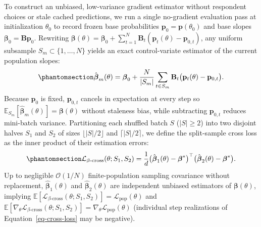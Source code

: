 \documentclass[
  11pt,
  letterpaper,
]{article}
\begin{document}
To construct an unbiased, low-variance gradient estimator without
respondent choices or stale cached predictions, we run a single
no-gradient evaluation pass at initialization \(\theta_0\) to record
frozen base probabilities \(\mathbf{p}_0 = \mathbf{p}(\theta_0)\) and
base slopes \(\boldsymbol{\beta}_0 = \mathbf{B}\mathbf{p}_0\). Rewriting
\(\boldsymbol{\beta}(\theta) = \boldsymbol{\beta}_0 + \sum_{t=1}^N \mathbf{B}_t (\mathbf{p}_t(\theta) - \mathbf{p}_{0,t})\),
any uniform subsample \(S_m \subset \{1, \dots, N\}\) yields an exact
control-variate estimator of the current population slopes:
\begin{equation}\protect\phantomsection\label{eq-cv-beta}{
\hat{\boldsymbol{\beta}}_m(\theta) = \boldsymbol{\beta}_0 + \frac{N}{|S_m|} \sum_{t \in S_m} \mathbf{B}_t \big(\mathbf{p}_t(\theta) - \mathbf{p}_{0,t}\big).
}\end{equation} Because \(\mathbf{p}_0\) is fixed, \(\mathbf{p}_{0,t}\)
cancels in expectation at every step so
\(\mathbb{E}_{S_m}[\hat{\boldsymbol{\beta}}_m(\theta)] = \boldsymbol{\beta}(\theta)\)
without staleness bias, while subtracting \(\mathbf{p}_{0,t}\) reduces
mini-batch variance. Partitioning each shuffled batch \(S\)
(\(|S| \ge 2\)) into two disjoint halves \(S_1\) and \(S_2\) of sizes
\(\lfloor |S| / 2 \rfloor\) and \(\lceil |S| / 2 \rceil\), we define the
split-sample cross loss as the inner product of their estimation errors:
\begin{equation}\protect\phantomsection\label{eq-cross-loss}{
\mathcal{L}_{\beta\text{-cross}}(\theta; S_1, S_2) = \frac{1}{d} \big(\hat{\boldsymbol{\beta}}_1(\theta) - \boldsymbol{\beta}^*\big)^\top \big(\hat{\boldsymbol{\beta}}_2(\theta) - \boldsymbol{\beta}^*\big).
}\end{equation} Up to negligible \(\mathcal{O}(1/N)\) finite-population
sampling covariance without replacement,
\(\hat{\boldsymbol{\beta}}_1(\theta)\) and
\(\hat{\boldsymbol{\beta}}_2(\theta)\) are independent unbiased
estimators of \(\boldsymbol{\beta}(\theta)\), implying
\(\mathbb{E}[\mathcal{L}_{\beta\text{-cross}}(\theta; S_1, S_2)] = \mathcal{L}_{\mathrm{pop}}(\theta)\)
and
\(\mathbb{E}[\nabla_\theta \mathcal{L}_{\beta\text{-cross}}(\theta; S_1, S_2)] = \nabla_\theta \mathcal{L}_{\mathrm{pop}}(\theta)\)
(individual step realizations of Equation~\ref{eq-cross-loss} may be
negative).
\end{document}

